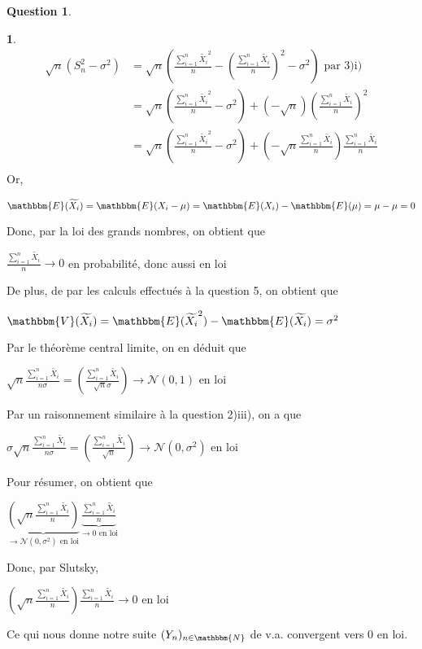 \documentclass[12pt]{article}
\newcommand{\N}{\mathbbm{N}}
\newcommand{\1}{\mathbbm{1}}
\newcommand{\E}{\mathbbm{E}}
\newcommand{\V}{\mathbbm{V}}
\newcommand{\Nc}{\mathcal{N}}
\newcommand{\Xti}{\widetilde{X_i}}
\theoremstyle{definition}\newtheorem{defn}{Définition}
\theoremstyle{definition}\newtheorem{exm}{Exemple}
\theoremstyle{definition}\newtheorem{rem}{Remarque}
\theoremstyle{definition}\newtheorem{algo}{Algorithme}
\theoremstyle{remark}\newtheorem{exo}{Exercice}
\theoremstyle{remark}\newtheorem{nota}{Notation}
\theoremstyle{definition}\newtheorem{1q}{Question}
\theoremstyle{definition}\newtheorem{2q}{Question}
\theoremstyle{definition}\newtheorem{3q}{Question}
\theoremstyle{definition}\newtheorem{4q}{Question}
\theoremstyle{definition}\newtheorem{2qs1}{}
\theoremstyle{definition}\newtheorem{2qs2}{}
\theoremstyle{definition}\newtheorem{2qs3}{}
\theoremstyle{definition}\newtheorem{2qs4}{}
\theoremstyle{definition}\newtheorem{4qs2}{}
\theoremstyle{definition}\newtheorem{4qs3}{}
\begin{document}
\begin{4q}
\begin{4qs3}
\begin{align*}
\sqrt{n}(S_n^2-\sigma^2) &= \sqrt{n}\left(\displaystyle\frac{\sum_{i=1}^n \Xti^2}{n}- \left(\frac{\sum_{i=1}^n\Xti}{n}\right)^2 - \sigma^2\right) \text{   par 3)i)}\\
&=  \sqrt{n}\left(\displaystyle\frac{\sum_{i=1}^n \Xti^2}{n} - \sigma^2\right) + (-\sqrt{n})\left(\frac{\sum_{i=1}^n\Xti}{n}\right)^2\\
&=\sqrt{n}\left(\displaystyle\frac{\sum_{i=1}^n \Xti^2}{n} - \sigma^2\right) + \left(-\sqrt{n}\frac{\sum_{i=1}^n\Xti}{n}\right)\frac{\sum_{i=1}^n\Xti}{n}\\
\end{align*}
Or,
\begin{center}$\E(\Xti) = \E(X_i- \mu) = \E(X_i) - \E(\mu) = \mu -\mu=0$\end{center}
Donc, par la loi des grands nombres, on obtient que 
\begin{center} $\displaystyle \frac{\sum_{i=1}^n\Xti}{n} \longrightarrow 0$ en probabilité, donc aussi en loi\end{center}
De plus, de par les calculs effectués à la question 5, on obtient que
\begin{center} $\V(\Xti) = \E(\Xti^2) - \E(\Xti) = \sigma^2$ \end{center}
Par le théorème central limite, on en déduit que
\begin{center} $\displaystyle\sqrt{n}\frac{\sum_{i=1}^n\Xti}{n\sigma}=\left(\frac{\sum_{i=1}^n\Xti}{\sqrt{n}\sigma}\right) \longrightarrow \Nc(0,1)$ en loi\end{center}
Par un raisonnement similaire à la question 2)iii), on a que 
\begin{center}$\displaystyle\sigma\sqrt{n}\frac{\sum_{i=1}^n\Xti}{n\sigma} = \displaystyle\left(\frac{\sum_{i=1}^n\Xti}{\sqrt{n}}\right) \longrightarrow \Nc(0,\sigma^2)$ en loi \end{center}
Pour résumer, on obtient que 
\begin{center}$  \underbrace{\left(\sqrt{n}\frac{\sum_{i=1}^n\Xti}{n}\right)}_{\longrightarrow \Nc(0,\sigma^2)\text{  en loi}} \underbrace{\frac{\sum_{i=1}^n\Xti}{n}}_{\longrightarrow 0 \text{  en loi}} $\end{center}
Donc, par Slutsky, 
\begin{center}$ \displaystyle\left(\sqrt{n}\frac{\sum_{i=1}^n\Xti}{n}\right) \frac{\sum_{i=1}^n\Xti}{n} \longrightarrow 0$ en loi\end{center}
Ce qui nous donne notre suite $(Y_n)_{n\in\N}$ de v.a. convergent vers 0 en loi.
\end{4qs3}



\end{4q}
\end{document}
